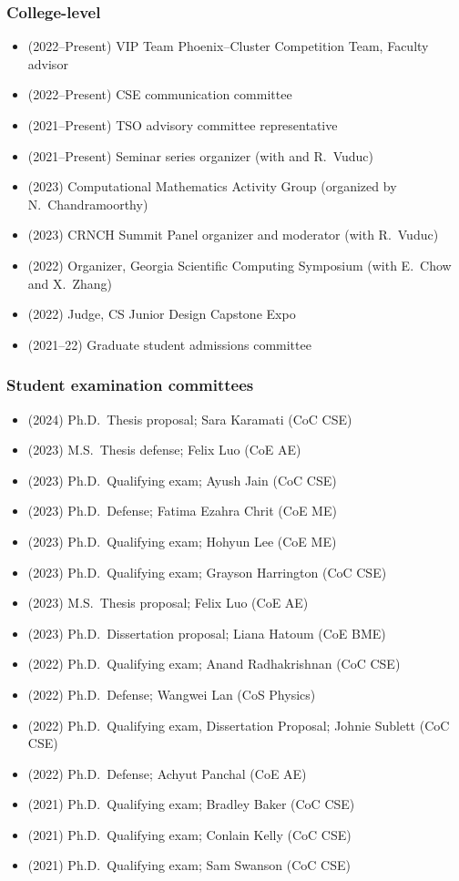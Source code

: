 \subsubsection{College-level}

\begin{itemize}
    \item (2022--Present) VIP Team Phoenix--Cluster Competition Team, Faculty advisor
    \item (2022--Present) CSE communication committee
    \item (2021--Present) TSO advisory committee representative
    \item (2021--Present) Seminar series organizer (with \Florian and R.\ Vuduc)
    \item (2023) Computational Mathematics Activity Group (organized by N.\ Chandramoorthy)
    \item (2023) CRNCH Summit Panel organizer and moderator (with R.\ Vuduc)
    \item (2022) Organizer, Georgia Scientific Computing Symposium (with E.\ Chow and X.\ Zhang)
    \item (2022) Judge, CS Junior Design Capstone Expo
    \item (2021--22) Graduate student admissions committee
\end{itemize}

\subsubsection{Student examination committees}

\begin{itemize}
    \item (2024) Ph.D.\ Thesis proposal; Sara Karamati (CoC CSE)
    \item (2023) M.S.\  Thesis defense; Felix Luo (CoE AE)
    \item (2023) Ph.D.\ Qualifying exam; Ayush Jain (CoC CSE)
    \item (2023) Ph.D.\ Defense; Fatima Ezahra Chrit (CoE ME)
    \item (2023) Ph.D.\ Qualifying exam; Hohyun Lee (CoE ME)
    \item (2023) Ph.D.\ Qualifying exam; Grayson Harrington (CoC CSE)
    \item (2023) M.S.\  Thesis proposal; Felix Luo (CoE AE)
    \item (2023) Ph.D.\ Dissertation proposal; Liana Hatoum (CoE BME)
    \item (2022) Ph.D.\ Qualifying exam; Anand Radhakrishnan (CoC CSE)
    \item (2022) Ph.D.\ Defense; Wangwei Lan (CoS Physics)
    \item (2022) Ph.D.\ Qualifying exam, Dissertation Proposal; Johnie Sublett (CoC CSE)
    \item (2022) Ph.D.\ Defense; Achyut Panchal (CoE AE)
    \item (2021) Ph.D.\ Qualifying exam; Bradley Baker (CoC CSE)
    \item (2021) Ph.D.\ Qualifying exam; Conlain Kelly (CoC CSE)
    \item (2021) Ph.D.\ Qualifying exam; Sam Swanson (CoC CSE)
\end{itemize}

